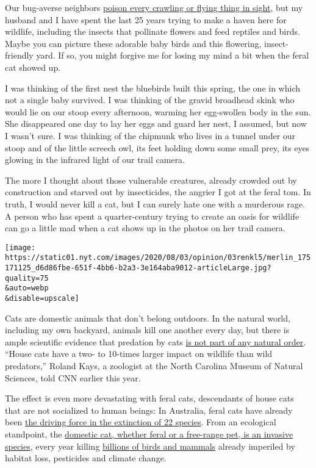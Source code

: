 Our bug-averse neighbors
\href{https://www.nytimes.com/2020/05/18/opinion/lawn-pesticides-insect-extinction.html?searchResultPosition=1}{poison
every crawling or flying thing in sight}, but my husband and I have
spent the last 25 years trying to make a haven here for wildlife,
including the insects that pollinate flowers and feed reptiles and
birds. Maybe you can picture these adorable baby birds and this
flowering, insect-friendly yard. If so, you might forgive me for losing
my mind a bit when the feral cat showed up.

I was thinking of the first nest the bluebirds built this spring, the
one in which not a single baby survived. I was thinking of the gravid
broadhead skink who would lie on our stoop every afternoon, warming her
egg-swollen body in the sun. She disappeared one day to lay her eggs and
guard her nest, I assumed, but now I wasn't sure. I was thinking of the
chipmunk who lives in a tunnel under our stoop and of the little screech
owl, its feet holding down some small prey, its eyes glowing in the
infrared light of our trail camera.

The more I thought about those vulnerable creatures, already crowded out
by construction and starved out by insecticides, the angrier I got at
the feral tom. In truth, I would never kill a cat, but I can surely hate
one with a murderous rage. A person who has spent a quarter-century
trying to create an oasis for wildlife can go a little mad when a cat
shows up in the photos on her trail camera.

\texttt{[image: https://static01.nyt.com/images/2020/08/03/opinion/03renkl5/merlin\_175171125\_d6d86fbe-651f-4bb6-b2a3-3e164aba9012-articleLarge.jpg?quality=75\\\&auto=webp\\\&disable=upscale]}

Cats are domestic animals that don't belong outdoors. In the natural
world, including my own backyard, animals kill one another every day,
but there is ample scientific evidence that predation by cats
\href{https://www.cnn.com/2020/03/12/world/pet-cats-disrupt-wildlife-scn/index.html}{is
not part of any natural order}. ``House cats have a two- to 10-times
larger impact on wildlife than wild predators,'' Roland Kays, a
zoologist at the North Carolina Museum of Natural Sciences, told CNN
earlier this year.

The effect is even more devastating with feral cats, descendants of
house cats that are not socialized to human beings: In Australia, feral
cats have already been
\href{https://www.nytimes.com/2019/04/25/magazine/australia-cat-killing.html?searchResultPosition=8}{the
driving force in the extinction of 22 species}. From an ecological
standpoint, the \href{http://www.iucngisd.org/gisd/}{domestic cat,
whether feral or a free-range pet, is an invasive species}, every year
killing
\href{https://www.fws.gov/southeast/pubs/keep-cats-indoors.pdf}{billions
of birds and mammals} already imperiled by habitat loss, pesticides and
climate change.

